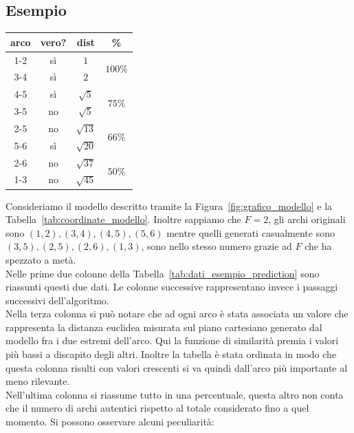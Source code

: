 \subsection{Esempio}
\begin{center}
	\begin{tabular}{|c|c|c|c|}
		\hline
		arco & vero? & dist & \%\\
		\hline
		1-2 & sì & $1$ & \multirow{2}{*}{$100\%$}\\
		3-4 & sì & $2$ & \\
		\hline
		4-5 & sì & $\sqrt{5}$ & \multirow{2}{*}{$75\%$}\\
		3-5 & no & $\sqrt{5}$ & \\
		\hline
		2-5 & no & $\sqrt{13}$ & \multirow{2}{*}{$66\%$}\\
		5-6 & sì & $\sqrt{20}$ & \\
		\hline
		2-6 & no & $\sqrt{37}$ & \multirow{2}{*}{$50\%$}\\
		1-3 & no & $\sqrt{45}$ & \\
		\hline
	\end{tabular}
	\label{tab:dati_esempio_prediction}
\end{center}
Consideriamo il modello descritto tramite la Figura~\ref{fig:grafico_modello} e la Tabella~\ref{tab:coordinate_modello}. Inoltre sappiamo che $F=2$, gli archi originali sono $(1, 2), (3, 4), (4, 5), (5, 6)$ mentre quelli generati casualmente sono $(3, 5), (2, 5), (2, 6), (1, 3)$, sono nello stesso numero grazie ad $F$ che ha spezzato a metà.\\
Nelle prime due colonne della Tabella~\ref{tab:dati_esempio_prediction} sono riassunti questi due dati. Le colonne successive rappresentano invece i passaggi successivi dell'algoritmo.\\
Nella terza colonna si può notare che ad ogni arco è stata associata un valore che rappresenta la distanza euclidea misurata sul piano cartesiano generato dal modello fra i due estremi dell'arco. Qui la funzione di similarità premia i valori più bassi a discapito degli altri. Inoltre la tabella è stata ordinata in modo che questa colonna risulti con valori crescenti si va quindi dall'arco più importante al meno rilevante.\\
Nell'ultima colonna si riassume tutto in una percentuale, questa altro non conta che il numero di archi autentici rispetto al totale considerato fino a quel momento. Si possono osservare alcuni peculiarità:
